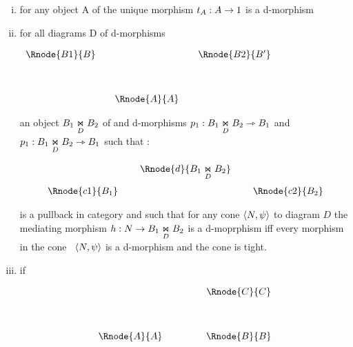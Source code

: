\documentclass[10pt,a4paper]{scrartcl}
\begin{document}
\begin{enumerate} [(i)]
	\item for any object A of  the unique morphism $t_A:A \morph 1$ is a d-morphism
	
	
	\item for all diagrams D of d-morphisms \begin{center}
$
\begin{array}{cp{0cm}cp{0cm}c}
\Rnode{B1}{B}& &            &  &\Rnode{B2}{B'} \\ [1.2cm]
               & &\Rnode{A}{A}& &
\end{array}
$
\end{center}
	
an object  $ \fibrex{B_1}{B_2}{D}$ of  and d-morphisms 
$p_1: \fibrex{B_1}{B_2}{D} \dmorph B_1$ and  $p_1: \fibrex{B_1}{B_2}{D} \dmorph B_1$ such that :

\begin{center}
\begin{displaymath}
\begin{array}{cp{0.1cm}cp{0.1cm} c}
            & &\Rnode{d}{\fibrex{B_1}{B_2}{D}}                  \\ [0.4cm]
\Rnode{c1}{B_1}& &                & & \Rnode{c2}{B_2} 
\end{array}
\end{displaymath}
\end{center}

is a pullback in category  and such that for any 
cone $\tuple{N,\psi}$ to diagram $D$
the mediating morphism $h: N \morph B_1 \underset{D}{\Join} B_2$ is a d-moprphism iff 
every morphism in the cone \ $\tuple{N,\psi}$ is a d-morphism and the cone is tight.

	\item if
\begin{center}
\begin{displaymath}
\begin{array}{cp{.9cm}c}
            & & \Rnode{C}{C} \\ [1.2cm]
\Rnode{A}{A}& & \Rnode{B}{B} \\
\end{array}
\end{displaymath}
\end{center}


\end{enumerate}
\end{document}
